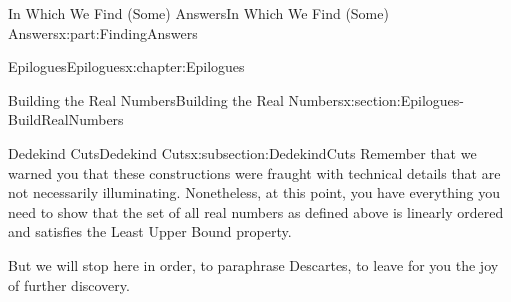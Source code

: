 \documentclass[oneside,10pt,]{book}
\numberwithin{equation}{section}
\providecommand\phantomsection{}
\begin{document}
\begin{partptx}{In Which We Find (Some) Answers}{}{In Which We Find (Some) Answers}{}{}{x:part:FindingAnswers}
\begin{chapterptx}{Epilogues}{}{Epilogues}{}{}{x:chapter:Epilogues}
\begin{sectionptx}{Building the Real Numbers}{}{Building the Real Numbers}{}{}{x:section:Epilogues-BuildRealNumbers}
\begin{subsectionptx}{Dedekind Cuts}{}{Dedekind Cuts}{}{}{x:subsection:DedekindCuts}
Remember that we warned you that these constructions were fraught with technical details that are not necessarily illuminating. Nonetheless, at this point, you have everything you need to show that the set of all real numbers as defined above is linearly ordered and satisfies the Least Upper Bound property.%
\par
But we will stop here in order, to paraphrase Descartes, to leave for you the joy of further discovery.%
\end{subsectionptx}
\end{sectionptx}
\end{chapterptx}
\end{partptx}
%
\backmatter%
%
\clearpage\phantomsection%
%
%
%
\typeout{************************************************}
\typeout{************************************************}
%
\end{document}

